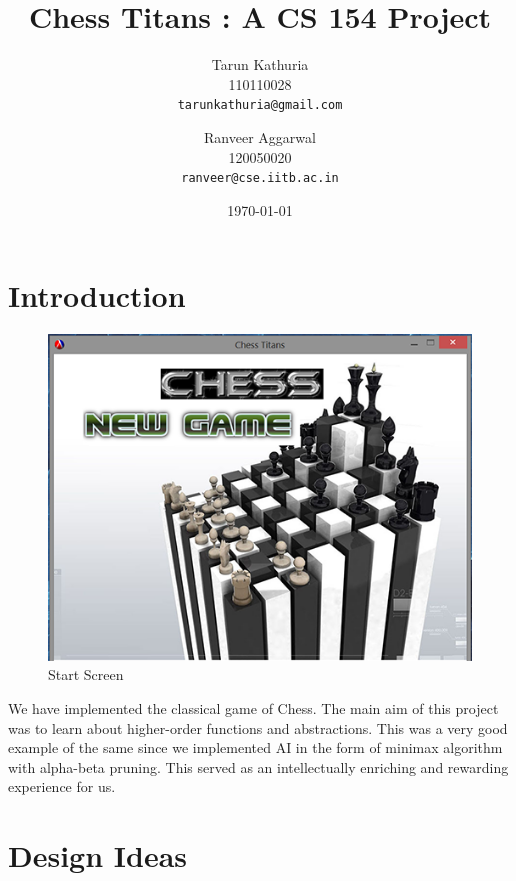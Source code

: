\documentclass[11pt]{article}
\begin{document}
\title{Chess Titans : A CS 154 Project}
\author{Tarun Kathuria \\ 110110028 \\ \texttt{tarunkathuria@gmail.com} \and Ranveer Aggarwal \\ 120050020 \\ \texttt{ranveer@cse.iitb.ac.in}}
\date{\today}
\maketitle

\section{Introduction}
\begin{figure}[h!]
	\caption{Start Screen}
	\centering
	\includegraphics{Snap2}
	\end{figure}
We have implemented the classical game of Chess. The main aim of this project was to learn about higher-order functions and abstractions. This was a very good example of the same since we implemented AI in the form of minimax algorithm with alpha-beta pruning. This served as an intellectually enriching and rewarding experience for us.

\section{Design Ideas}
\end{document}
